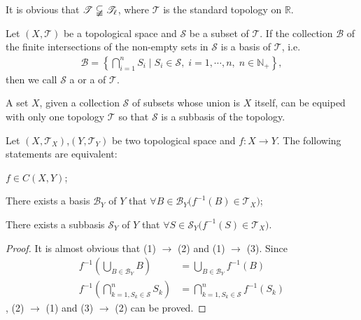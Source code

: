 \documentclass[openany]{book}
\begin{document}
It is obvious that $\mathscr T \varsubsetneqq\mathscr T_\ell$, where $\mathscr T$ is the standard topology on $\mathbb R$.

\begin{definition}\label{subbasis}
Let $(X,\mathscr T)$ be a topological space and $\mathscr S$ be a subset of $\mathscr T$.
If the collection $\mathscr B$ of the finite intersections of the non-empty sets in $\mathscr S$ is a basis of $\mathscr T$, i.e.\ 
\begin{align*}
	\mathscr B = \left\{
		\bigcap\limits_{i=1}^n S_i \mid
			S_i \in \mathscr S,\;i=1,\cdots,n,\;n\in\mathbb N_+\right\},
\end{align*}
then we call $\mathscr S$ a  or a  of $\mathscr T$.
\end{definition}

A set $X$, given a collection $\mathscr S$ of subsets whose union is $X$ itself, can be equiped with only one topology $\mathscr T$ so that $\mathscr S$ is a subbasis of the topology. 

\begin{theorem}\label{continuity_basis}
Let $(X,\mathscr T_X)$,$(Y,\mathscr T_Y)$ be two topological space and $f \colon X\to Y$.
The following statements are equivalent:
\begin{conditionlist}[label=(\arabic*)]
\item $f \in C(X, Y)$;
\item There exists a basis $\mathscr B_Y$ of $Y$ that $\forall B\in \mathscr B_Y\big(
	f^{-1}(B) \in \mathscr T_X\big)$;
\item There exists a subbasis $\mathscr S_Y$ of $Y$ that $\forall S\in \mathscr S_Y\big(
	f^{-1}(S) \in \mathscr T_X\big)$.
\end{conditionlist}
\end{theorem}
\begin{proof}
It is almost obvious that (1) $\to$ (2) and (1) $\to$ (3). Since
\begin{align*}
	f^{-1} \left(
		\bigcup_{B\in \mathscr B_Y} B\right) &= \bigcup_{B\in \mathscr B_Y}  f^{-1}(B)\\
	f^{-1}\left(
		\bigcap^n_{k=1,S_k\in \mathscr S} S_k\right) &=\bigcap^n_{k=1,S_k\in \mathscr S} f^{-1}(S_k)
\end{align*}
, (2) $\to$ (1) and (3) $\to$ (2) can be proved. 
\end{proof}
\end{document}
